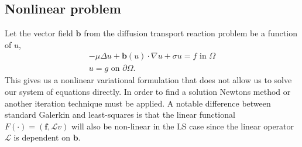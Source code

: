 \subsection{Nonlinear problem}
Let the vector field $\mathbf{b}$ from the diffusion transport reaction problem be a function of $u$,
\begin{align}
	-\mu \Delta u + \mathbf{b}(u) \cdot \nabla u +\sigma u = f \text{ in } \Omega \\
	u = g \text{ on } \partial \Omega.
	\label{eq:DiffTransNonLin}
\end{align}
This gives us a nonlinear variational formulation that does not allow us to solve our system of equations directly. In order to find a solution Newtons method or another iteration technique must be applied. A notable difference between standard Galerkin and least-squares is that the linear functional $F(\cdot) = (\mathbf{f},\mathcal{L} v)$ will also be non-linear in the LS case since the linear operator $\mathcal{L}$ is dependent on $\mathbf{b}$.
